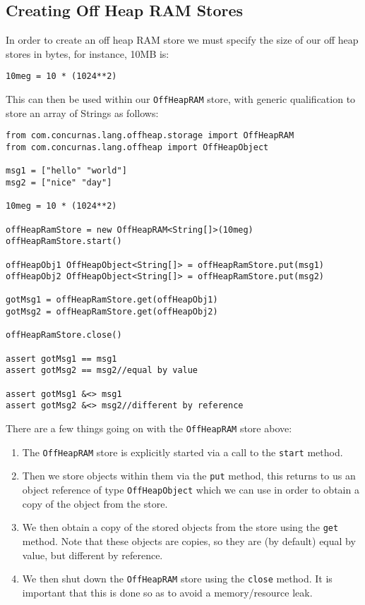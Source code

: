 \documentclass[conc-doc]{subfiles}
\begin{document}
\subsection{Creating Off Heap RAM Stores}
In order to create an off heap RAM store we must specify the size of our off heap stores in bytes, for instance, 10MB is:

\begin{lstlisting}
10meg = 10 * (1024**2)
\end{lstlisting}

This can then be used within our \lstinline{OffHeapRAM} store, with generic qualification to store an array of Strings as follows:

\begin{lstlisting}
from com.concurnas.lang.offheap.storage import OffHeapRAM
from com.concurnas.lang.offheap import OffHeapObject

msg1 = ["hello" "world"]
msg2 = ["nice" "day"]

10meg = 10 * (1024**2)

offHeapRamStore = new OffHeapRAM<String[]>(10meg)
offHeapRamStore.start()

offHeapObj1 OffHeapObject<String[]> = offHeapRamStore.put(msg1)
offHeapObj2 OffHeapObject<String[]> = offHeapRamStore.put(msg2)

gotMsg1 = offHeapRamStore.get(offHeapObj1)
gotMsg2 = offHeapRamStore.get(offHeapObj2)

offHeapRamStore.close()

assert gotMsg1 == msg1
assert gotMsg2 == msg2//equal by value

assert gotMsg1 &<> msg1
assert gotMsg2 &<> msg2//different by reference
\end{lstlisting}

There are a few things going on with the \lstinline{OffHeapRAM} store above:

\begin{enumerate}
	\item The \lstinline{OffHeapRAM} store is explicitly started via a call to the \lstinline{start} method.
	\item Then we store objects within them via the \lstinline{put} method, this returns to us an object reference of type \lstinline{OffHeapObject} which we can use in order to obtain a copy of the object from the store.
	\item We then obtain a copy of the stored objects from the store using the \lstinline{get} method. Note that these objects are copies, so they are (by default) equal by value, but different by reference.
	\item We then shut down the \lstinline{OffHeapRAM} store using the \lstinline{close} method. It is important that this is done so as to avoid a memory/resource leak.
\end{enumerate}
\end{document}
